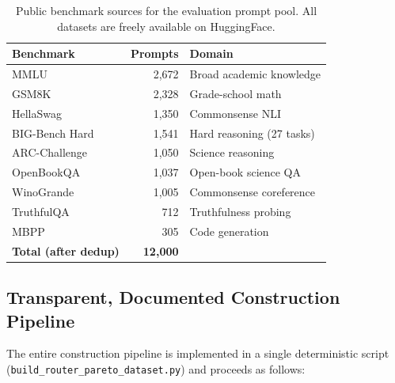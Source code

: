 \begin{table}[h]
\centering
\caption{Public benchmark sources for the evaluation prompt pool.
All datasets are freely available on HuggingFace.}
\label{tab:prompt_sources}
\small
\begin{tabular}{lrl}
\toprule
\textbf{Benchmark} & \textbf{Prompts} & \textbf{Domain} \\
\midrule
MMLU~\cite{hendrycks2021measuring}            & 2{,}672 & Broad academic knowledge \\
GSM8K~\cite{cobbe2021gsm8k}                   & 2{,}328 & Grade-school math \\
HellaSwag~\cite{zellers2019hellaswag}          & 1{,}350 & Commonsense NLI \\
BIG-Bench Hard~\cite{suzgun2022challenging}    & 1{,}541 & Hard reasoning (27 tasks) \\
ARC-Challenge~\cite{clark2018arc}              & 1{,}050 & Science reasoning \\
OpenBookQA~\cite{mihaylov2018suit}             & 1{,}037 & Open-book science QA \\
WinoGrande~\cite{sakaguchi2020winogrande}      & 1{,}005 & Commonsense coreference \\
TruthfulQA~\cite{lin2022truthfulqa}            &    712 & Truthfulness probing \\
MBPP~\cite{austin2021program}                  &    305 & Code generation \\
\midrule
\textbf{Total (after dedup)}                   & \textbf{12{,}000} & \\
\bottomrule
\end{tabular}
\end{table}

\subsection{Transparent, Documented Construction Pipeline}
\label{app:dataset_pipeline}

The entire construction pipeline is implemented in a single deterministic
script (\texttt{build\_router\_pareto\_dataset.py}) and proceeds as follows:

